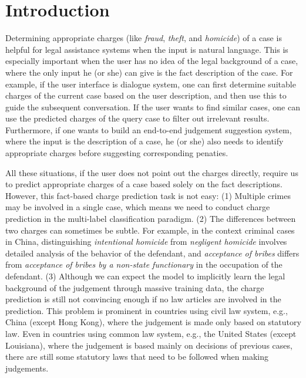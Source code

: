 \section{Introduction}
Determining appropriate charges (like \emph{fraud}, \emph{theft}, and \emph{homicide}) of a case is helpful for legal assistance systems when the input is natural language. This is especially important when the user has no idea of the legal background of a case, where the only input he (or she) can give is the fact description of the case.
For example, if the user interface is dialogue system, one can first determine suitable charges of the current case based on the user description, and then use this to guide the subsequent conversation. If the user wants to find similar cases, one can use the predicted charges of the query case to filter out irrelevant results. Furthermore, if one wants to build an end-to-end judgement suggestion system, where the input is the description of a case, he (or she) also needs to identify appropriate charges before suggesting corresponding penaties.

All these situations, if the user does not point out the charges directly, require us to predict appropriate charges of a case based solely on the fact descriptions. However, this fact-based charge prediction task is not easy:
(1) Multiple crimes may be involved in a single case, which means we need to conduct charge prediction in the multi-label classification paradigm. 
(2) The differences between two charges can sometimes be subtle. For example, in the context criminal cases in China, distinguishing \emph{intentional homicide} from \emph{negligent homicide} involves detailed analysis of the behavior of the defendant, and \emph{acceptance of bribes} differs from \emph{acceptance of bribes by a non-state functionary} in the occupation of the defendant. 
(3)  Although we can expect the model to implicitly learn the legal background of the judgement through massive training data, the charge prediction is still not convincing enough if no law articles are involved in the prediction. This problem is prominent in countries using civil law system, e.g., China (except Hong Kong), where the judgement is made only based on statutory law. Even in countries using common law system, e.g., the United States (except Louisiana), where the judgement is based mainly on decisions of previous cases, there are still some statutory laws that need to be followed when making judgements. 

